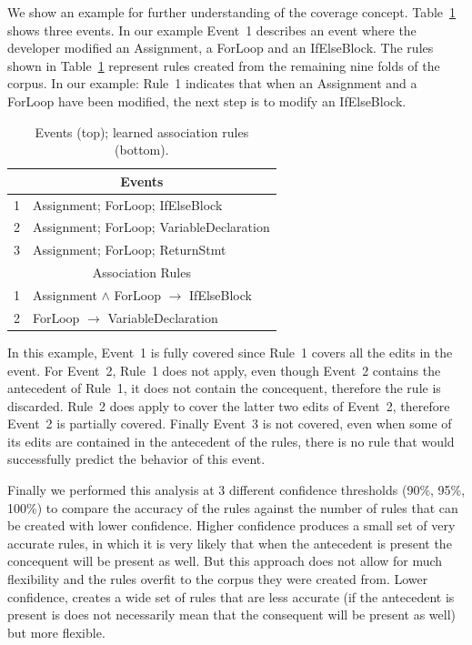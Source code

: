 \documentclass[sigconf]{acmart}
\begin{document}
We show an example for further understanding of the coverage concept.
Table~\ref{rulesandinstances} shows three events. In 
our example Event~1 describes an event
where the developer modified an Assignment, a ForLoop and an IfElseBlock.
The rules shown in Table~\ref{rulesandinstances} represent rules created
from the remaining nine folds of the corpus. In our example: Rule~1 
indicates that when an Assignment and a ForLoop have been modified,
the next step is to modify an IfElseBlock.


\begin{table}[ht]
  \centering
  \caption{Events (top); learned association rules (bottom). \label{rulesandinstances}}{\small
\begin{tabular}{ll}
\toprule
\multicolumn{2}{c}{Events} \\
\midrule
1 & Assignment; ForLoop; IfElseBlock  \\
2 & Assignment; ForLoop; VariableDeclaration\\  
3 & Assignment; ForLoop;  ReturnStmt \\
\midrule
 \multicolumn{2}{c}{Association Rules} \\                     
\midrule
1 & Assignment $\wedge$ ForLoop $\rightarrow$ IfElseBlock \\  
2 & ForLoop $\rightarrow$ VariableDeclaration \\   
\bottomrule
\end{tabular}
}
\end{table}

In this example, Event~1 is fully covered since Rule~1 covers all
the edits in the event. For Event~2, Rule~1 does not apply, even though
Event~2 contains the antecedent of Rule~1, it does not contain the 
concequent, therefore the rule is discarded. Rule~2 does apply to 
cover the latter two
edits of Event~2,
therefore Event~2 is partially covered. Finally Event~3 is not covered,
even when some of its edits are contained in the antecedent of the rules,
there is no rule that would successfully predict the behavior of this 
event. 

Finally we performed this analysis at 3 different confidence thresholds
(90\%, 95\%, 100\%) to compare the accuracy of the rules against the 
number of rules that can be created with lower confidence. 
Higher confidence produces a small set of very
accurate rules, in which it is very likely that when the antecedent
is present the concequent will be present as well. But this approach
does not allow for much flexibility and the rules overfit to the corpus 
they were created from. Lower 
confidence, creates a wide set of rules that are less accurate (if
the antecedent is present is does not necessarily mean that the 
consequent will be present as well) but more flexible. 
\end{document}
